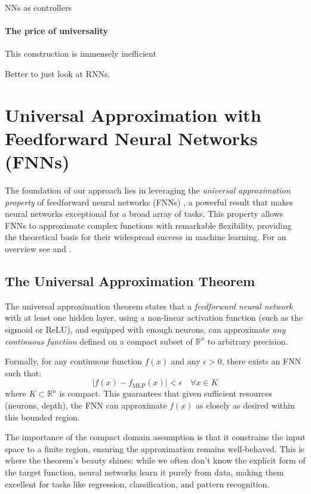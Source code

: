 \documentclass{article}
\theoremstyle{definition}
\theoremstyle{remark}
\begin{document}
NNs as controllers \citep{sontag1992neural}


\paragraph{The price of universality}
This construction is immensely inefficient

Better to just look at RNNs. 



\newpage




\newpage
\appendix 

\section{Universal Approximation with Feedforward Neural Networks (FNNs)}\label{sec:uniapproxffn}

The foundation of our approach lies in leveraging the \textit{universal approximation property} of feedforward neural networks (FNNs) \citep{poggio1990networks}, a powerful result that makes neural networks exceptional for a broad array of tasks. This property allows FNNs to approximate complex functions with remarkable flexibility, providing the theoretical basis for their widespread success in machine learning.
For an overview see \citep{scarselli1998universal} and \citep{augustine2024survey}.




\subsection{The Universal Approximation Theorem}
The universal approximation theorem states that a \textit{feedforward neural network} with at least one hidden layer, using a non-linear activation function (such as the sigmoid or ReLU), and equipped with enough neurons, can approximate \textit{any continuous function} defined on a compact subset of \(\mathbb{R}^n\) to arbitrary precision.

Formally, for any continuous function \(f(x)\) and any \(\epsilon > 0\), there exists an FNN such that:
\[
| f(x) - f_{\text{MLP}}(x) | < \epsilon \quad \forall x \in K
\]
where \(K \subset \mathbb{R}^n\) is compact. This guarantees that given sufficient resources (neurons, depth), the FNN can approximate \(f(x)\) as closely as desired within this bounded region.

The importance of the compact domain assumption is that it constrains the input space to a finite region, ensuring the approximation remains well-behaved.
This is where the theorem’s beauty shines: while we often don’t know the explicit form of the target function, neural networks learn it purely from data, making them excellent for tasks like regression, classification, and pattern recognition.
\end{document}
